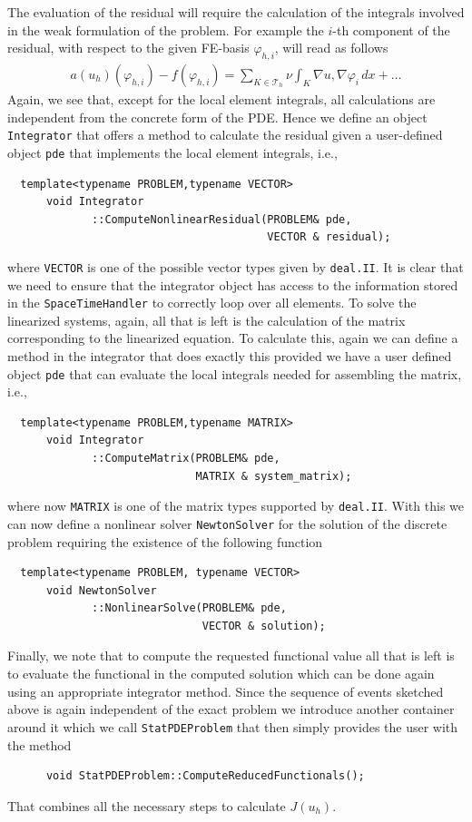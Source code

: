 \documentclass[prodmode,acmtoms]{acmsmall}
\numberwithin{equation}{section}
\renewcommand{\phi}{\varphi}
\newcommand{\deal}{\texttt{deal.II}}
\begin{document}
The evaluation of the residual will require the calculation of the integrals 
involved in the weak formulation of the problem. For example 
the $i$-th component of the residual, with respect to the given FE-basis 
$\phi_{h,i}$, will read as follows
\begin{align}\label{eq:residual_vector}
 a(u_h)(\phi_{h,i}) - f(\phi_{h,i}) = \sum_{K\in \mathcal T_h} \nu\int_K \nabla u, \nabla \phi_i\,dx + \ldots
 \end{align}
Again, we see that, except for the local element integrals, all 
calculations are independent from the concrete form of the PDE. 
Hence we define an object \texttt{Integrator}
that offers a method to calculate the residual given a user-defined 
object \texttt{pde} that implements the local element integrals, i.e.,
\begin{lstlisting}
  template<typename PROBLEM,typename VECTOR>
      void Integrator
             ::ComputeNonlinearResidual(PROBLEM& pde, 
                                        VECTOR & residual);
\end{lstlisting}
where \texttt{VECTOR} is one of the possible vector types given by \deal{}.
It is clear that we need to ensure that the integrator object has access
to the information stored in the \texttt{SpaceTimeHandler}
to correctly loop over all elements.
To solve the linearized systems, again, all that is left is the calculation
of the matrix corresponding to the linearized equation. To calculate this,
again we can define a method in the integrator that does exactly this provided
we have a user defined object \texttt{pde} that can evaluate the local 
integrals needed for assembling the matrix, i.e.,
\begin{lstlisting}
  template<typename PROBLEM,typename MATRIX>
      void Integrator
             ::ComputeMatrix(PROBLEM& pde, 
                             MATRIX & system_matrix);
\end{lstlisting}
where now \texttt{MATRIX} is one of the matrix types supported by \deal{}.
With this we can now define a nonlinear solver \texttt{NewtonSolver} 
for the solution of the discrete problem requiring the existence of the 
following function
\begin{lstlisting}
  template<typename PROBLEM, typename VECTOR>
      void NewtonSolver
             ::NonlinearSolve(PROBLEM& pde, 
                              VECTOR & solution);
\end{lstlisting}

Finally, we note that to compute the requested functional value 
all that is left is to evaluate the functional in the computed solution 
which can be done again using an appropriate integrator method.
Since the sequence of events sketched above is again independent of the 
exact problem we introduce another container around it which we call 
\texttt{StatPDEProblem} that then simply provides the user with the 
method
\begin{lstlisting}
      void StatPDEProblem::ComputeReducedFunctionals();
\end{lstlisting}
That combines all the necessary steps to calculate $J(u_h)$. 
\end{document}
